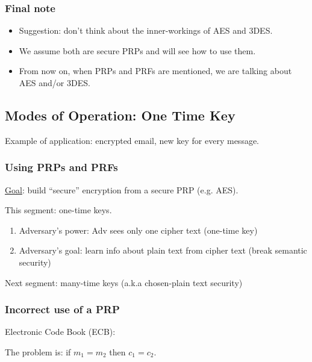 \documentclass[12pt]{book}
\newcommand{\idiii}[1]{%
	\pgfmathsetmacro{\idii}{#1-1}}
\begin{document}
\subsubsection{Final note}
\begin{itemize}
	\item Suggestion: don't think about the inner-workings of AES and 3DES.
	\item We assume both are secure PRPs and will see how to use them.
	\item From now on, when PRPs and PRFs are mentioned, we are talking about AES and/or 3DES.
\end{itemize}

\subsection{Modes of Operation: One Time Key}
Example of application: encrypted email, new key for every message.
\subsubsection{Using PRPs and PRFs}
\underline{Goal}: build ``secure'' encryption from a secure PRP (e.g. AES).

This segment: one-time keys.
\begin{enumerate}
	\item Adversary's power: Adv sees only one cipher text (one-time key)
	\item Adversary's goal: learn info about plain text from cipher text (break semantic security)
\end{enumerate}
Next segment: many-time keys (a.k.a chosen-plain text security)

\subsubsection{Incorrect use of a PRP}
Electronic Code Book (ECB):
\begin{center}
\end{center}
The problem is: if $m_{1}=m_{2}$ then $c_{1}=c_{2}$.
\end{document}
